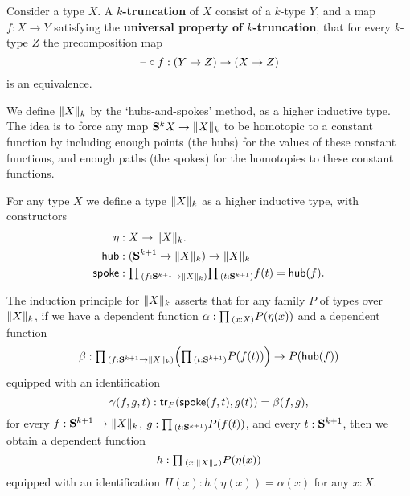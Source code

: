 \begin{defn}
  Consider a type $X$. A \textbf{$k$-truncation} of $X$ consist of a $k$-type $Y$, and a map $f:X\to Y$ satisfying the \textbf{universal property of $k$-truncation}, that for every $k$-type $Z$ the precomposition map
  \begin{equation*}
    \blank\circ f: (Y\to Z)\to (X\to Z)
  \end{equation*}
  is an equivalence.
\end{defn}

We define $\trunc{k}{X}$ by the `hubs-and-spokes' method, as a higher inductive type. The idea is to force any map $\sphere{k}{X}\to \trunc{k}{X}$ to be homotopic to a constant function by including enough points (the hubs) for the values of these constant functions, and enough paths (the spokes) for the homotopies to these constant functions.

\begin{defn}
  For any type $X$ we define a type $\trunc{k}{X}$ as a higher inductive type, with constructors
  \begin{align*}
    \eta & : X \to \trunc{k}{X}. \\
    \mathsf{hub} & : (\sphere{k+1}\to\trunc{k}{X})\to\trunc{k}{X} \\
    \mathsf{spoke} & : \prd{f:\sphere{k+1}\to\trunc{k}{X}}\prd{t:\sphere{k+1}}f(t)=\mathsf{hub}(f).
  \end{align*}
\end{defn}

\begin{rmk}
  The induction principle for $\trunc{k}{X}$ asserts that for any family $P$ of types over $\trunc{k}{X}$, if we have a dependent function $\alpha : \prd{x:X}P(\eta(x))$ and a dependent function
  \begin{equation*}
    \beta : \prd{f:\sphere{k+1}\to\trunc{k}{X}}\Big(\prd{t:\sphere{k+1}}P(f(t))\Big)\to P(\mathsf{hub}(f))
  \end{equation*}
  equipped with an identification
  \begin{equation*}
    \gamma(f,g,t):\tr_P(\mathsf{spoke}(f,t),g(t))=\beta(f,g),
  \end{equation*}
  for every $f:\sphere{k+1}\to\trunc{k}{X}$, $g:\prd{t:\sphere{k+1}}P(f(t))$, and every $t:\sphere{k+1}$, then we obtain a dependent function
  \begin{equation*}
    h:\prd{x:\trunc{k}{X}}P(\eta(x))
  \end{equation*}
  equipped with an identification $H(x):h(\eta(x))=\alpha(x)$ for any $x:X$.
\end{rmk}

